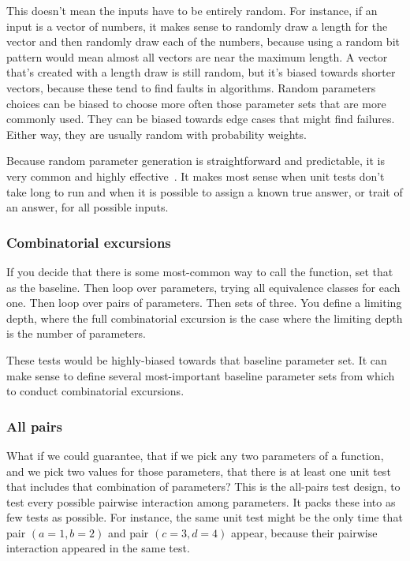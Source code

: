 \documentclass[fleqn,10pt]{olplainarticle}
\begin{document}
This doesn't mean the inputs have to be entirely random. For
instance, if an input is a vector of numbers, it makes sense
to randomly draw a length for the vector and then randomly
draw each of the numbers, because using a random bit pattern
would mean almost all vectors are near the maximum length.
A vector that's created with a length draw is still random,
but it's biased towards shorter vectors, because these tend
to find faults in algorithms.
Random parameters choices can be biased to choose more often
those parameter sets that are more commonly used. They can
be biased towards edge cases that might find failures. Either way,
they are usually random with probability weights.

Because random parameter generation is straightforward
and predictable, it is very common and highly effective~\citep{arcuri2011random}.
It makes most sense when unit tests don't take long to run
and when it is possible to assign a known true answer, or trait
of an answer, for all possible inputs.


\subsubsection{Combinatorial excursions}
If you decide that there is some most-common way to call
the function, set that as the baseline. Then loop over parameters,
trying all equivalence classes for each one. Then loop over pairs of parameters. Then sets of three. You define a limiting depth,
where the full combinatorial excursion is the case where the
limiting depth is the number of parameters.

These tests would be highly-biased towards that baseline parameter set.
It can make sense to define several most-important baseline
parameter sets from which to conduct combinatorial excursions.


\subsubsection{All pairs}
What if we could guarantee, that if we pick any two parameters
of a function, and we pick two values for those parameters,
that there is at least one unit test that includes that combination
of parameters? This is the all-pairs test design, to test
every possible pairwise interaction among parameters.
It packs these into as few tests as possible. For instance,
the same unit test might be the only time that pair
$(a=1, b=2)$ and pair $(c=3, d=4)$ appear, because their
pairwise interaction appeared in the same test.
\end{document}
